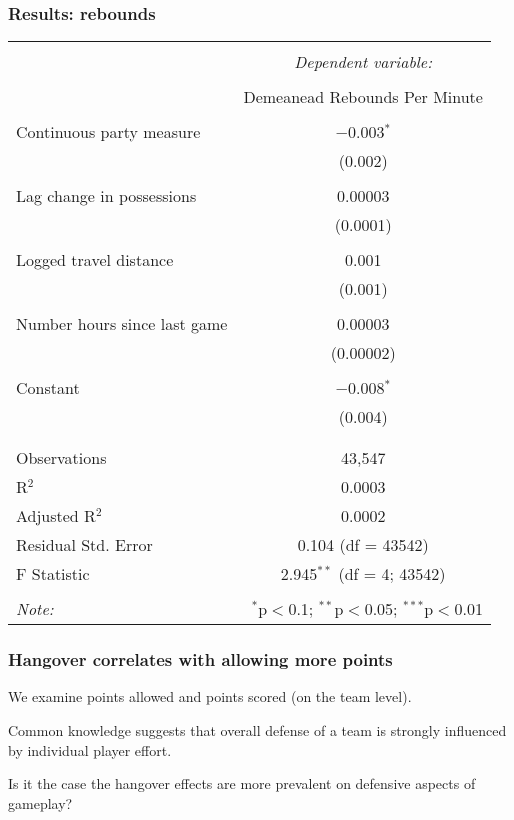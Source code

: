 \documentclass{beamer}
\begin{document}
\begin{frame}   \frametitle{Results: rebounds}
  \centering
  \tiny{
\begin{tabular}{@{\extracolsep{5pt}}lc}  \\[-1.8ex]\hline  \hline \\[-1.8ex]   & \multicolumn{1}{c}{\textit{Dependent variable:}} \\  \cline{2-2}  \\[-1.8ex] & Demeanead Rebounds Per Minute \\  \hline \\[-1.8ex]   Continuous party measure & $-$0.003$^{*}$ \\    & (0.002) \\    & \\   Lag change in possessions & 0.00003 \\    & (0.0001) \\    & \\   Logged travel distance & 0.001 \\    & (0.001) \\    & \\   Number hours since last game & 0.00003 \\    & (0.00002) \\    & \\   Constant & $-$0.008$^{*}$ \\    & (0.004) \\    & \\  \hline \\[-1.8ex]  Observations & 43,547 \\  R$^{2}$ & 0.0003 \\  Adjusted R$^{2}$ & 0.0002 \\  Residual Std. Error & 0.104 (df = 43542) \\  F Statistic & 2.945$^{**}$ (df = 4; 43542) \\  \hline  \hline \\[-1.8ex]  \textit{Note:}  & \multicolumn{1}{r}{$^{*}$p$<$0.1; $^{**}$p$<$0.05; $^{***}$p$<$0.01} \\  \end{tabular}  
} \end{frame}

\begin{frame}   \frametitle{Hangover correlates with allowing more points}
  We examine points allowed and points scored (on the team level).

  \vspace{12pt}Common knowledge suggests that overall defense of a team is strongly influenced by individual player effort.

  \vspace{12pt}Is it the case the hangover effects are more prevalent on defensive aspects of gameplay? \end{frame}
\end{document}
